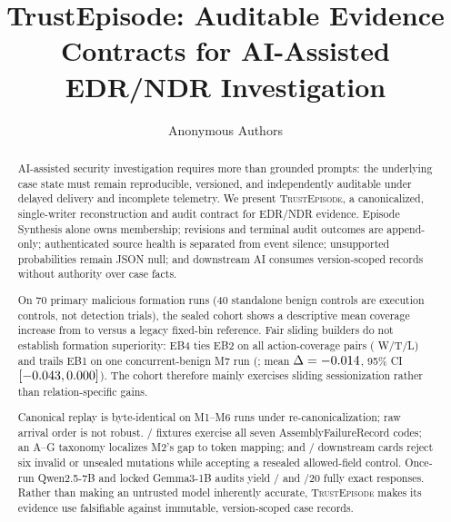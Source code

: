 \documentclass[sigconf,anonymous,review]{acmart}
\newcommand{\trustepisode}{\textsc{TrustEpisode}\xspace}
\begin{document}
\title{TrustEpisode: Auditable Evidence Contracts for AI-Assisted EDR/NDR Investigation}

\author{Anonymous Authors}

\begin{abstract}
AI-assisted security investigation requires more than grounded prompts: the underlying case state
must remain reproducible, versioned, and independently auditable under delayed delivery and
incomplete telemetry. We present \trustepisode{}, a canonicalized, single-writer reconstruction and
audit contract for EDR/NDR evidence. Episode Synthesis alone owns membership; revisions and terminal
audit outcomes are append-only; authenticated source health is separated from event silence;
unsupported probabilities remain JSON null; and downstream AI consumes version-scoped records without
authority over case facts.

On 70 primary malicious formation runs (40 standalone benign controls are execution controls, not
detection trials), the sealed cohort shows a descriptive mean coverage increase from \EbZeroCov{} to
\TeCov{} versus a legacy fixed-bin reference. Fair sliding builders do not establish formation
superiority: EB4 ties EB2 on all action-coverage pairs (\EbTwoActionWTL{} W/T/L) and trails EB1 on one
concurrent-benign M7 run (\EbOneActionWTL{}; mean $\Delta=-0.014{}$, 95\% CI
$[-0.043{},0.000{}]$). The cohort therefore mainly exercises sliding
sessionization rather than relation-specific gains.

Canonical replay is byte-identical on \DetNRuns{} M1--M6 runs under re-canonicalization; raw arrival
order is not robust. \AuditPass{}/\AuditTotal{} fixtures exercise all seven AssemblyFailureRecord
codes; an A--G taxonomy localizes M2's gap to token mapping; and \AgentBoundaryPass{}/\AgentBoundaryTotal{}
downstream cards reject six invalid or unsealed mutations while accepting a resealed allowed-field
control. Once-run Qwen2.5-7B and locked Gemma3-1B audits yield \LlmPilotExact{}/\LlmPilotTotal{} and
\GemmaPilotExact{}/20 fully exact responses. Rather than making an untrusted model inherently accurate,
\trustepisode{} makes its evidence use falsifiable against immutable, version-scoped case records.
\end{abstract}

\end{document}
